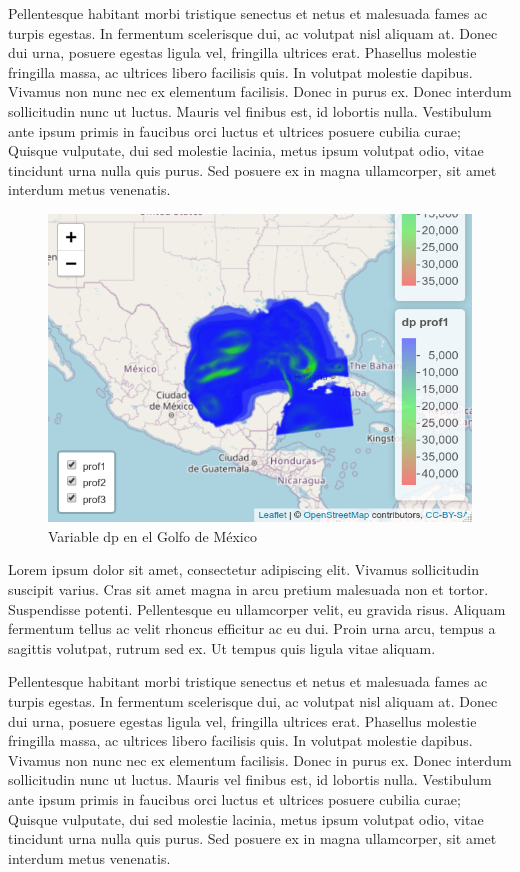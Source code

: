 \documentclass[
]{article}
\begin{document}
Pellentesque habitant morbi tristique senectus et netus et malesuada fames ac turpis egestas. In fermentum scelerisque dui, ac volutpat nisl aliquam at. Donec dui urna, posuere egestas ligula vel, fringilla ultrices erat. Phasellus molestie fringilla massa, ac ultrices libero facilisis quis. In volutpat molestie dapibus. Vivamus non nunc nec ex elementum facilisis. Donec in purus ex. Donec interdum sollicitudin nunc ut luctus. Mauris vel finibus est, id lobortis nulla. Vestibulum ante ipsum primis in faucibus orci luctus et ultrices posuere cubilia curae; Quisque vulputate, dui sed molestie lacinia, metus ipsum volutpat odio, vitae tincidunt urna nulla quis purus. Sed posuere ex in magna ullamcorper, sit amet interdum metus venenatis.

\begin{figure}
\includegraphics[width=0.95\linewidth]{images/golfomex02} \caption{Variable dp en el Golfo de México}\label{fig:Mapa04}
\end{figure}

Lorem ipsum dolor sit amet, consectetur adipiscing elit. Vivamus sollicitudin suscipit varius. Cras sit amet magna in arcu pretium malesuada non et tortor. Suspendisse potenti. Pellentesque eu ullamcorper velit, eu gravida risus. Aliquam fermentum tellus ac velit rhoncus efficitur ac eu dui. Proin urna arcu, tempus a sagittis volutpat, rutrum sed ex. Ut tempus quis ligula vitae aliquam.

Pellentesque habitant morbi tristique senectus et netus et malesuada fames ac turpis egestas. In fermentum scelerisque dui, ac volutpat nisl aliquam at. Donec dui urna, posuere egestas ligula vel, fringilla ultrices erat. Phasellus molestie fringilla massa, ac ultrices libero facilisis quis. In volutpat molestie dapibus. Vivamus non nunc nec ex elementum facilisis. Donec in purus ex. Donec interdum sollicitudin nunc ut luctus. Mauris vel finibus est, id lobortis nulla. Vestibulum ante ipsum primis in faucibus orci luctus et ultrices posuere cubilia curae; Quisque vulputate, dui sed molestie lacinia, metus ipsum volutpat odio, vitae tincidunt urna nulla quis purus. Sed posuere ex in magna ullamcorper, sit amet interdum metus venenatis.
\end{document}
